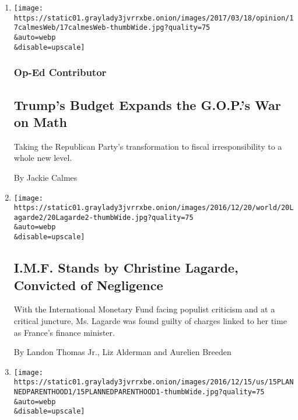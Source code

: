 \begin{enumerate}
\def\labelenumi{\arabic{enumi}.}
\item
  \href{/2017/03/17/opinion/trumps-budget-expands-the-gops-war-on-math.html}{}

  \texttt{[image: https://static01.graylady3jvrrxbe.onion/images/2017/03/18/opinion/17calmesWeb/17calmesWeb-thumbWide.jpg?quality=75\\\&auto=webp\\\&disable=upscale]}

  \hypertarget{op-ed-contributor}{%
  \subsubsection{Op-Ed Contributor}\label{op-ed-contributor}}

  \hypertarget{trumps-budget-expands-the-gops-war-on-math}{%
  \subsection{Trump's Budget Expands the G.O.P.'s War on
  Math}\label{trumps-budget-expands-the-gops-war-on-math}}

  Taking the Republican Party's transformation to fiscal
  irresponsibility to a whole new level.

  By Jackie Calmes
\item
  \href{/2016/12/19/business/imf-trial-christine-lagarde-france-verdict.html}{}

  \texttt{[image: https://static01.graylady3jvrrxbe.onion/images/2016/12/20/world/20Lagarde2/20Lagarde2-thumbWide.jpg?quality=75\\\&auto=webp\\\&disable=upscale]}

  \hypertarget{imf-stands-by-christine-lagarde-convicted-of-negligence}{%
  \subsection{I.M.F. Stands by Christine Lagarde, Convicted of
  Negligence}\label{imf-stands-by-christine-lagarde-convicted-of-negligence}}

  With the International Monetary Fund facing populist criticism and at
  a critical juncture, Ms. Lagarde was found guilty of charges linked to
  her time as France's finance minister.

  By Landon Thomas Jr., Liz Alderman and Aurelien Breeden
\item
  \href{/2016/12/14/us/politics/obama-administration-planned-parenthood.html}{}

  \texttt{[image: https://static01.graylady3jvrrxbe.onion/images/2016/12/15/us/15PLANNEDPARENTHOOD1/15PLANNEDPARENTHOOD1-thumbWide.jpg?quality=75\\\&auto=webp\\\&disable=upscale]}


\end{enumerate}
